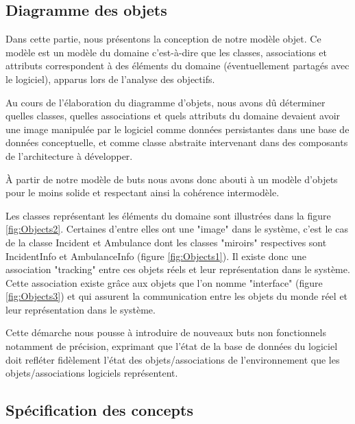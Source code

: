 \subsection{Diagramme des objets}

	Dans cette partie, nous présentons la conception de notre modèle objet. Ce
	modèle est un modèle du domaine c'est-à-dire que les classes, associations
	et attributs correspondent à des éléments du domaine (éventuellement
	partagés avec le logiciel), apparus lors de l'analyse des objectifs. 

	Au cours de l'élaboration du diagramme d'objets, nous avons dû déterminer
	quelles classes, quelles associations et quels attributs du domaine devaient avoir une
	image manipulée par le logiciel comme données persistantes dans une base de
	données conceptuelle, et comme classe abstraite intervenant dans des
	composants de l'architecture à développer. 

	À partir de notre modèle de buts nous avons donc abouti à un modèle d'objets
	pour le moins solide et respectant ainsi la cohérence intermodèle. 

	Les classes représentant les éléments du domaine sont illustrées dans la
	figure \ref{fig:Objects2}. Certaines d'entre elles ont une "image" dans le système, c'est
	le cas de la classe Incident et Ambulance dont les classes "miroirs"
	respectives sont IncidentInfo et AmbulanceInfo (figure  \ref{fig:Objects1}). Il existe donc
	une association "tracking" entre ces objets réels et leur représentation
	dans le système. Cette association existe grâce aux objets que l'on nomme
	"interface" (figure  \ref{fig:Objects3}) et qui assurent la communication entre les objets du
	monde réel et leur représentation dans le système. 

	Cette démarche nous pousse à introduire de nouveaux buts non fonctionnels
	notamment de précision, exprimant que l'état de la base de données du
	logiciel doit refléter fidèlement l'état des objets/associations de
	l'environnement que les objets/associations logiciels représentent. 


\subsection{Spécification des concepts}
